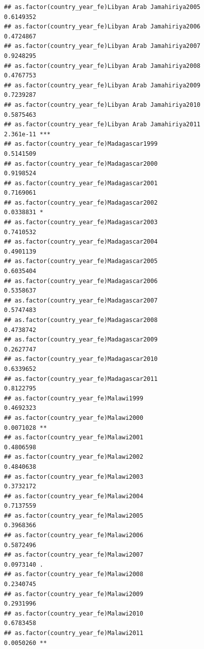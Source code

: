 \documentclass[
  a4paper,
]{article}
\begin{document}
\begin{verbatim}
## as.factor(country_year_fe)Libyan Arab Jamahiriya2005           0.6149352    
## as.factor(country_year_fe)Libyan Arab Jamahiriya2006           0.4724867    
## as.factor(country_year_fe)Libyan Arab Jamahiriya2007           0.9248295    
## as.factor(country_year_fe)Libyan Arab Jamahiriya2008           0.4767753    
## as.factor(country_year_fe)Libyan Arab Jamahiriya2009           0.7239287    
## as.factor(country_year_fe)Libyan Arab Jamahiriya2010           0.5875463    
## as.factor(country_year_fe)Libyan Arab Jamahiriya2011           2.361e-11 ***
## as.factor(country_year_fe)Madagascar1999                       0.5141509    
## as.factor(country_year_fe)Madagascar2000                       0.9198524    
## as.factor(country_year_fe)Madagascar2001                       0.7169061    
## as.factor(country_year_fe)Madagascar2002                       0.0338831 *  
## as.factor(country_year_fe)Madagascar2003                       0.7410532    
## as.factor(country_year_fe)Madagascar2004                       0.4901139    
## as.factor(country_year_fe)Madagascar2005                       0.6035404    
## as.factor(country_year_fe)Madagascar2006                       0.5358637    
## as.factor(country_year_fe)Madagascar2007                       0.5747483    
## as.factor(country_year_fe)Madagascar2008                       0.4738742    
## as.factor(country_year_fe)Madagascar2009                       0.2627747    
## as.factor(country_year_fe)Madagascar2010                       0.6339652    
## as.factor(country_year_fe)Madagascar2011                       0.8122795    
## as.factor(country_year_fe)Malawi1999                           0.4692323    
## as.factor(country_year_fe)Malawi2000                           0.0071028 ** 
## as.factor(country_year_fe)Malawi2001                           0.4806598    
## as.factor(country_year_fe)Malawi2002                           0.4840638    
## as.factor(country_year_fe)Malawi2003                           0.3732172    
## as.factor(country_year_fe)Malawi2004                           0.7137559    
## as.factor(country_year_fe)Malawi2005                           0.3968366    
## as.factor(country_year_fe)Malawi2006                           0.5872496    
## as.factor(country_year_fe)Malawi2007                           0.0973140 .  
## as.factor(country_year_fe)Malawi2008                           0.2340745    
## as.factor(country_year_fe)Malawi2009                           0.2931996    
## as.factor(country_year_fe)Malawi2010                           0.6783458    
## as.factor(country_year_fe)Malawi2011                           0.0050260 ** 

\end{verbatim}
\end{document}
